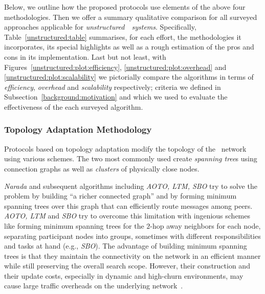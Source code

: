 Below, we outline how the proposed protocols use elements of the above four
methodologies. Then we offer a summary qualitative comparison for all surveyed
approaches applicable for \emph{unstructured}~\p~\emph{systems}.
Specifically, Table~\ref{unstructured:table} summarises, for each
effort, the methodologies it incorporates, its special highlights as well as 
a rough estimation of the pros and cons in its implementation. Last but
not least, with Figures~\ref{unstructured:plot:efficiency}, \ref{unstructured:plot:overhead}
and \ref{unstructured:plot:scalability} we pictorially compare the
algorithms in terms of \emph{efficiency}, \emph{overhead} and \emph{scalability}
respectively; criteria we defined in Subsection~\ref{background:motivation}
and which we used to evaluate the effectiveness of the each surveyed algorithm.

\subsubsection{Topology Adaptation Methodology}

Protocols based on topology adaptation 
modify the topology of the \p\ network
using various schemes. The two most commonly used
create \emph{spanning tree}s using connection graphs
as well as  \emph{clusters} of physically close nodes.

\emph{Narada} and subsequent algorithms including 
\emph{AOTO, LTM, SBO} try to solve the problem
by building ``a richer connected graph'' and by forming 
minimum spanning trees over
this graph that can efficiently route messages among peers. 
\emph{AOTO, LTM} and \emph{SBO} try to
overcome this limitation with ingenious schemes
like forming minimum spanning trees
for the $2$-hop away neighbors for each node, separating participant nodes into
groups, sometimes with different responsibilities and tasks at hand (e.g.,
\emph{SBO}). 
The advantage of building minimum spanning trees is that
they maintain the connectivity on the network in
an efficient manner while still preserving the overall search scope.
However, their construction and their update costs,
especially in dynamic and high-churn environments,
may cause large traffic overheads on the underlying
network~\cite{CRZ2000,CRSZ2001,CRSZ2002}.

